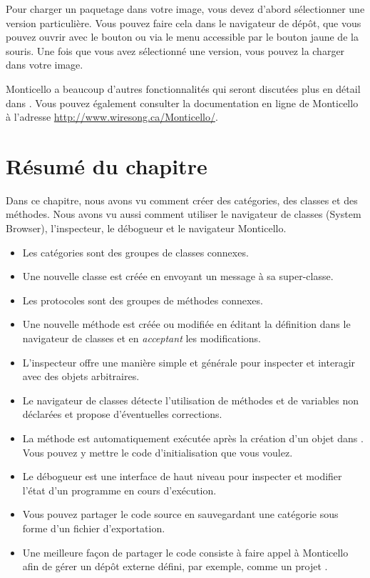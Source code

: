 \documentclass[a4paper,10pt,twoside]{book}
\begin{document}

Pour charger un paquetage dans votre image, vous devez d'abord
sélectionner une version particulière. Vous pouvez faire cela dans le
navigateur de dépôt, que vous pouvez ouvrir avec le bouton
 ou via le menu accessible par le bouton jaune de la
souris. Une fois que vous avez sélectionné une version, vous pouvez la
charger dans votre image.


Monticello a beaucoup d'autres fonctionnalités qui seront discutées
plus en détail dans .
Vous pouvez également consulter la documentation en ligne de
Monticello à l'adresse \url{http://www.wiresong.ca/Monticello/}.

\section{Résumé du chapitre}
Dans ce chapitre, nous avons vu comment créer des catégories, des classes
et des méthodes. Nous avons vu aussi comment utiliser le navigateur de
classes (System Browser), l'inspecteur, le débogueur et le
navigateur Monticello.

\begin{itemize}
  \item Les catégories sont des groupes de classes connexes.
  \item Une nouvelle classe est créée en envoyant un message à sa super-classe.
  \item Les protocoles sont des groupes de méthodes connexes.
  \item Une nouvelle méthode est créée ou modifiée en éditant la définition dans le navigateur de classes et en \emph{acceptant} les modifications.
  \item L'inspecteur offre une manière simple et générale pour inspecter et interagir avec des objets arbitraires.
  \item Le navigateur de classes détecte l'utilisation de méthodes et de variables non déclarées et propose d'éventuelles corrections.
  \item La méthode  est automatiquement exécutée après
    la création d'un objet dans \pharo. Vous pouvez y mettre
    le code d'initialisation que vous voulez.
  \item Le débogueur est une interface de haut niveau pour inspecter et modifier l'état d'un programme en cours d'exécution.
  \item Vous pouvez partager le code source en sauvegardant une
    catégorie sous forme d'un fichier d'exportation.
  \item Une meilleure façon de partager le code consiste à faire
    appel à Monticello afin de gérer un dépôt externe défini, par
    exemple, comme un projet \squeaksource.
\end{itemize}

\ifx\wholebook\relax\else
\end{document}
